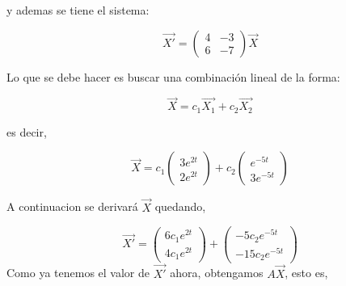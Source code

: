 \documentclass[titlepage]{article}
\begin{document}
            y ademas se tiene el sistema:
            
                \begin{equation*}
                    \vec{X'} = 
                    \begin{pmatrix}
                        4 & -3 \\
                        6 & -7
                    \end{pmatrix}   
                    \vec{X}
                \end{equation*}
                
            Lo que se debe hacer es buscar una combinación lineal de la forma:
            
                \begin{equation*}
                    \vec{X} = c_1\vec{X_1} + c_2\vec{X_2} 
                \end{equation*}  
                
            es decir,
                
                \begin{equation*}
                    \vec{X} = c_1
                    \begin{pmatrix}
                        3e^{2t}  \\
                        2e^{2t} 
                    \end{pmatrix}   
                    + c_2
                    \begin{pmatrix}
                        e^{-5t}  \\
                        3e^{-5t} 
                    \end{pmatrix}   
                \end{equation*}
                
            A continuacion se derivará $\vec{X}$ quedando,
                
                \begin{equation*}
                    \vec{X'} = 
                    \begin{pmatrix}
                        6c_1e^{2t}  \\
                        4c_1e^{2t} 
                    \end{pmatrix} +  
                    \begin{pmatrix}
                        -5c_2e^{-5t}  \\
                        -15c_2e^{-5t} 
                    \end{pmatrix}   
                \end{equation*}        
            Como ya tenemos el valor de $\vec{X'}$ ahora, obtengamos $A\vec{X}$, esto es,
                
\end{document}
